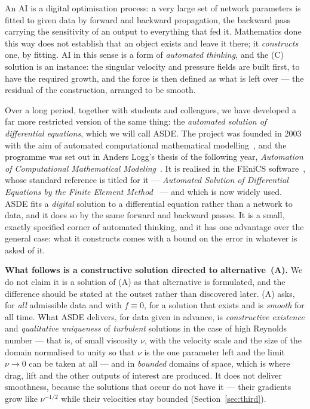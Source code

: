 \documentclass[11pt]{article}
\begin{document}
An AI is a digital optimisation process: a very large set of network parameters is fitted to
given data by forward and backward propagation, the backward pass carrying the sensitivity of an
output to everything that fed it. Mathematics done this way does not establish that an object exists and
leave it there; it \emph{constructs} one, by fitting. AI in this sense is a form of
\emph{automated thinking}, and the (C) solution is an instance: the singular velocity and pressure
fields are built first, to have the required growth, and the force is then defined as what is left
over --- the residual of the construction, arranged to be smooth.

Over a long period, together with students and colleagues, we have developed a far more restricted
version of the same thing: the \emph{automated solution of differential equations}, which we will
call ASDE. The project was founded in 2003 with the aim of automated computational mathematical
modelling~\cite{fenics03}, and the programme was set out in Anders Logg's thesis of the following
year, \emph{Automation of Computational Mathematical Modeling}~\cite{logg04,logg07}. It is realised in the FEniCS
software~\cite{fenicsbook,fenics15,unicorn,massparallel,fenicshpc,fenicsmulti}, whose standard
reference is titled for it --- \emph{Automated Solution of Differential Equations by the Finite
Element Method}~\cite{fenicsbook} --- and which is now widely used. ASDE fits a \emph{digital} solution to a differential equation rather than a
network to data, and it does so by the same forward and backward passes. It is a small, exactly specified
corner of automated thinking, and it has one advantage over the general case: what it constructs
comes with a bound on the error in whatever is asked of it.

\textbf{What follows is a constructive solution directed to alternative~(A).} We do not claim it is a
solution of (A) as that alternative is formulated, and the difference should be stated at the outset
rather than discovered later. (A) asks, for \emph{all} admissible data and with $f\equiv0$, for a
solution that exists and is \emph{smooth} for all time. What ASDE delivers, for data given in
advance, is \emph{constructive existence} and \emph{qualitative uniqueness} of \emph{turbulent}
solutions in the case of high Reynolds number --- that is, of small viscosity $\nu$, with the
velocity scale and the size of the domain normalised to unity so that $\nu$ is the one parameter
left and the limit $\nu\to0$ can be taken at all --- and in \emph{bounded} domains of space, which
is where drag, lift and the other outputs of interest are produced. It does not deliver smoothness, because the solutions that occur do not have it --- their gradients
grow like $\nu^{-1/2}$ while their velocities stay bounded (Section~\ref{sec:third}).
\end{document}
